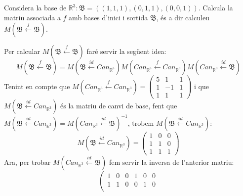 \documentclass[a4paper, 12pt]{article}
\begin{document}
    \begin{exercici}
        Considera la base de $\mathbb{R}^3: \mathfrak{B} = ((1,1,1), (0,1,1), (0,0,1))$. Calcula la
        matriu associada a $f$ amb bases d'inici i sortida $\mathfrak{B}$, és a dir calculeu $M(\mathfrak{B} \xleftarrow{f} \mathfrak{B})$.
    \end{exercici}
    \begin{solucio}
        Per calcular $M(\mathfrak{B} \xleftarrow{f} \mathfrak{B})$ faré servir la següent idea:
        \begin{displaymath}
            M(\mathfrak{B} \xleftarrow{f} \mathfrak{B}) = M(\mathfrak{B} \xleftarrow{id} Can_{\mathbb{R}^3}) M(Can_{\mathbb{R}^3} \xleftarrow{f} Can_{\mathbb{R}^3})  M(Can_{\mathbb{R}^3} \xleftarrow{id} \mathfrak{B})
        \end{displaymath}
        Tenint en compte que $M(Can_{\mathbb{R}^3} \xleftarrow{f} Can_{\mathbb{R}^3}) =
        \left(
            \begin{smallmatrix}
                5 & 1 & 1\\
                1 & -1 & 1\\
                1 & 1 & 1
            \end{smallmatrix}
        \right)$ i que $M(\mathfrak{B} \xleftarrow{id} Can_{\mathbb{R}^3})$ és la matriu de canvi de
        base, fent que $M(\mathfrak{B} \xleftarrow{id} Can_{\mathbb{R}^3}) = M(Can_{\mathbb{R}^3} \xleftarrow{id} \mathfrak{B})^{-1}$,
        trobem $M(\mathfrak{B} \xleftarrow{id} Can_{\mathbb{R}^3})$:
        \begin{displaymath}
            M(\mathfrak{B} \xleftarrow{id} Can_{\mathbb{R}^3}) =
            \left(
                \begin{array}{c|c|c}
                    1 & 0 & 0\\
                    1 & 1 & 0\\
                    1 & 1 & 1
                \end{array}
            \right)
        \end{displaymath}
        Ara, per trobar $M(Can_{\mathbb{R}^3} \xleftarrow{id} \mathfrak{B})$ fem servir la inversa
        de l'anterior matriu:
        \begin{displaymath}
            \left(
                \begin{array}{ccc|ccc}
                    1 & 0 & 0 & 1 & 0 & 0\\
                    1 & 1 & 0 & 0 & 1 & 0\\

\end{array}
\end{displaymath}
\end{solucio}
\end{document}
